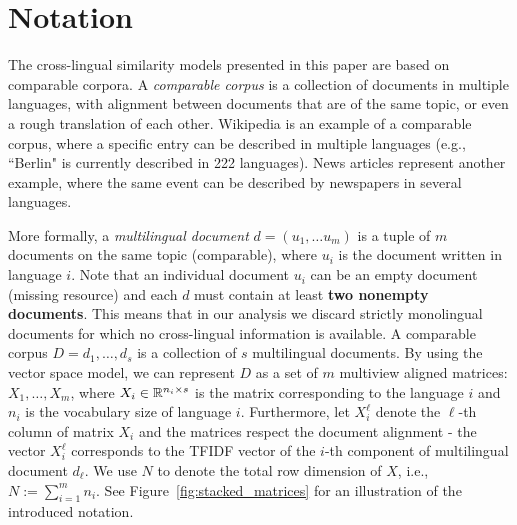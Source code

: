 \section{Notation}\label{chap:crosslingual:notation}

The cross-lingual similarity models presented in this paper are based on comparable corpora.
A \emph{comparable corpus} is a collection of documents in multiple languages, with alignment
between documents that are of the same topic, or even a rough translation of each other.
Wikipedia is an example of a comparable corpus, where a specific entry can be described in multiple
languages (e.g., ``Berlin" is currently described in 222 languages). News articles represent
another example, where the same event can be described by newspapers in several languages.

More formally, a \emph{multilingual document} $d = (u_1,\ldots u_m)$ is a tuple of $m$ documents
on the same topic (comparable), where $u_i$ is the document written in language $i$. Note that
an individual document $u_i$ can be an empty document (missing resource) and each $d$ must contain
at least \textbf{two nonempty documents}. This means that in our analysis we discard strictly
monolingual documents for which no cross-lingual information is available. A comparable corpus
$D = {d_1, \ldots, d_s}$ is a collection of $s$ multilingual documents. By using the vector space
model, we can represent $D$ as a set of $m$ multiview aligned matrices:
$X_1,\ldots,X_m$, where $X_i \in \mathbb{R}^{n_i \times s}$
is the matrix corresponding to the language $i$ and $n_i$ is the vocabulary size of language $i$.
Furthermore, let $X_i^{\ell}$ denote the $\ell$-th column of matrix $X_i$ and the matrices respect
the document alignment - the vector $X_i^\ell$ corresponds to the TFIDF vector of the $i$-th component
of multilingual document $d_\ell$. We use $N$ to denote the total row dimension of $X$, i.e.,
$N:= \sum_{i=1}^m n_i$. See Figure~\ref{fig:stacked_matrices} for an illustration of the introduced notation.

